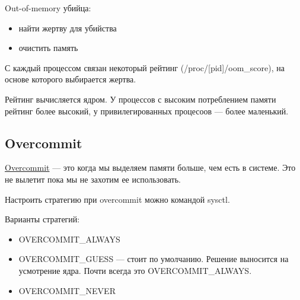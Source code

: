 Out-of-memory убийца:
\begin{itemize}
	\item найти жертву для убийства
	\item очистить память
\end{itemize}

С каждый процессом связан некоторый рейтинг (/proc/[pid]/oom\_score), на основе которого
выбирается жертва.

Рейтинг вычисляется ядром. У процессов с высоким потреблением памяти рейтинг более
высокий, у привилегированных процесоов --- более маленький.

\subsection{Overcommit}

\begin{Def}
	\underline{Overcommit} --- это когда мы выделяем памяти больше, чем есть в системе.
	Это не вылетит пока мы не захотим ее использовать.
\end{Def}

Настроить стратегию при overcommit можно командой sysctl. 

Варианты стратегий:
\begin{itemize}
	\item OVERCOMMIT\_ALWAYS
	\item OVERCOMMIT\_GUESS --- стоит по умолчанию. Решение выносится на
	усмотрение ядра. Почти всегда это OVERCOMMIT\_ALWAYS.
	\item OVERCOMMIT\_NEVER
\end{itemize}












